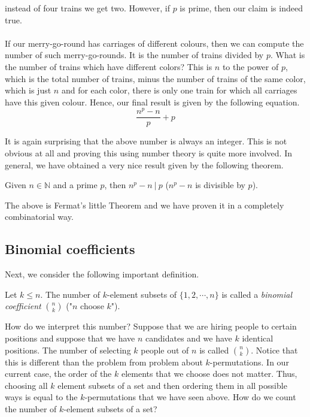 instead of four trains we get two. However, if $p$ is prime, then our claim is indeed true.
\\
\\
If our merry-go-round has carriages of different colours, then we can compute the number of such merry-go-rounds.
It is the number of trains divided by $p$. What is the number of trains which have different colors?
This is $n$ to the power of $p$, which is the total number of trains, minus the number of trains of the same color, which is just $n$ and for each color, there is only one train for which all carriages have this given colour.
Hence, our final result is given by the following equation.
$$
\frac{n^p-n}{p} + p
$$

It is again surprising that the above number is always an integer. This is not obvious at all and proving this using number theory is quite more involved. In general, we have obtained a very nice result given by the following theorem.

\begin{theorem}
Given $n \in \mathbb{N}$ and a prime $p$, then $n^p -n\ |\ p$ ($n^p - n$ is divisible by $p$).  
\end{theorem}
\noindent
The above is Fermat's little Theorem and we have proven it in a completely combinatorial way.

\subsection{Binomial coefficients}

Next, we consider the following important definition.

\begin{defn}
Let $k \leq n$. The number of $k$-element subsets of $\{1, 2, \cdots, n\}$ is called a \textit{binomial coefficient} ${n \choose k}$ ("$n$ choose $k$").
\end{defn}

How do we interpret this number? Suppose that we are hiring people to certain positions and suppose that we have $n$ candidates and we have $k$ identical positions.
The number of selecting $k$ people out of $n$ is called ${n \choose k}$. Notice that this is different than the problem from problem about $k$-permutations.
In our current case, the order of the $k$ elements that we choose does not matter. Thus, choosing all $k$ element subsets of a set and then ordering them in all possible ways
is equal to the $k$-permutations that we have seen above. How do we count the number of $k$-element subsets of a set?

